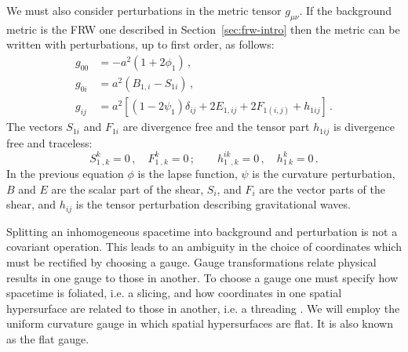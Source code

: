 We must also consider perturbations in the metric tensor $g_{\mu\nu}$. If the
background metric is the FRW one described in Section~\ref{sec:frw-intro} then
the metric can be written with perturbations, up to first order, as follows:
% 
\begin{align}
 \label{eq:pertmetric-intro}
 g_{00} &= -a^2 (1 + 2\phi_1) \,, \nonumber\\
 g_{0i} &= a^2 (B_{1,i} - S_{1i}) \,, \nonumber\\
 g_{ij} &= a^2\left[ (1 - 2\psi_1)\delta_{ij} + 2E_{1,ij} + 2F_{1(i,j)} +
h_{1ij}
\right] \,.
\end{align}
% 
The vectors $S_{1i}$ and $F_{1i}$ are divergence free and the tensor part
$h_{1ij}$
is divergence free and traceless:
% 
\begin{equation}
 S^k_{1~,k} = 0\,, \quad F^k_{1~,k}=0\,; \qquad h^{ik}_{1~~,k} = 0\,,
  \quad h^k_{1~k}= 0\,.
\end{equation}
% 
In the previous equation $\phi$ is the lapse function, $\psi$ is the curvature
perturbation, $B$ and $E$ are the scalar part of the shear, $S_i$, and $F_i$
are the vector parts of the shear, and $h_{ij}$ is the tensor perturbation
describing gravitational waves.


Splitting an inhomogeneous spacetime into background and perturbation is not a
covariant operation. This leads to an ambiguity in the choice of coordinates
which must be rectified by choosing a gauge. Gauge transformations relate
physical results in one gauge to those in another. To choose a gauge one must
specify how spacetime is foliated, i.e. a slicing, and how coordinates in one
spatial hypersurface are related to those in another, i.e. a threading
\cite{Malik:2008im}. We will
employ the uniform curvature gauge in which spatial hypersurfaces are flat. It
is also known as the flat gauge.

